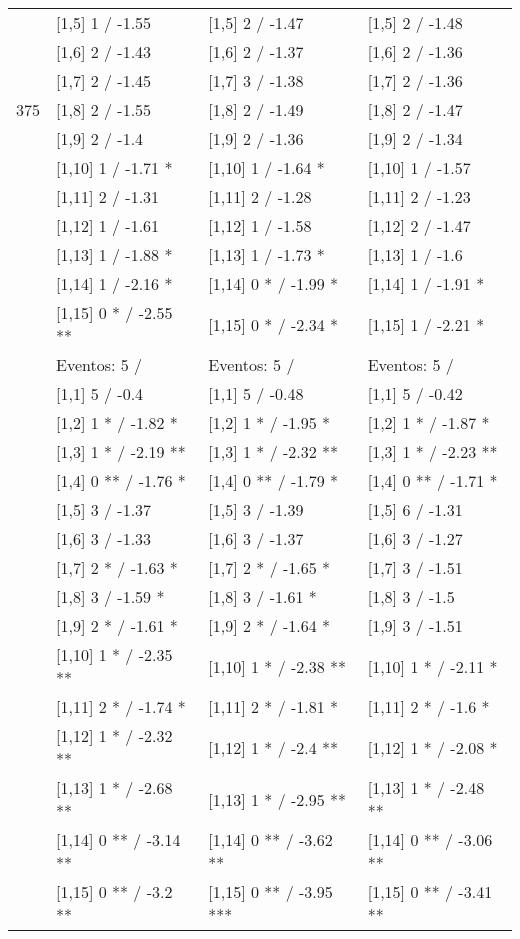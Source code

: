 \begin{table}
\begin{tabular}[t]{llll}
 & {}[1,5] 1  / -1.55 & {}[1,5] 2  / -1.47 & {}[1,5] 2  / -1.48\\
 & {}[1,6] 2  / -1.43 & {}[1,6] 2  / -1.37 & {}[1,6] 2  / -1.36\\
 & {}[1,7] 2  / -1.45 & {}[1,7] 3  / -1.38 & {}[1,7] 2  / -1.36\\
375 & {}[1,8] 2  / -1.55 & {}[1,8] 2  / -1.49 & {}[1,8] 2  / -1.47\\
\addlinespace
 & {}[1,9] 2  / -1.4 & {}[1,9] 2  / -1.36 & {}[1,9] 2  / -1.34\\
 & {}[1,10] 1  / -1.71 * & {}[1,10] 1  / -1.64 * & {}[1,10] 1  / -1.57\\
 & {}[1,11] 2  / -1.31 & {}[1,11] 2  / -1.28 & {}[1,11] 2  / -1.23\\
 & {}[1,12] 1  / -1.61 & {}[1,12] 1  / -1.58 & {}[1,12] 2  / -1.47\\
 & {}[1,13] 1  / -1.88 * & {}[1,13] 1  / -1.73 * & {}[1,13] 1  / -1.6\\
\addlinespace
 & {}[1,14] 1  / -2.16 * & {}[1,14] 0 * / -1.99 * & {}[1,14] 1  / -1.91 *\\
 & {}[1,15] 0 * / -2.55 ** & {}[1,15] 0 * / -2.34 * & {}[1,15] 1  / -2.21 *\\
 & Eventos:  5 / & Eventos:  5 / & Eventos:  5 /\\
 & {}[1,1] 5  / -0.4 & {}[1,1] 5  / -0.48 & {}[1,1] 5  / -0.42\\
 & {}[1,2] 1 * / -1.82 * & {}[1,2] 1 * / -1.95 * & {}[1,2] 1 * / -1.87 *\\
\addlinespace
 & {}[1,3] 1 * / -2.19 ** & {}[1,3] 1 * / -2.32 ** & {}[1,3] 1 * / -2.23 **\\
 & {}[1,4] 0 ** / -1.76 * & {}[1,4] 0 ** / -1.79 * & {}[1,4] 0 ** / -1.71 *\\
 & {}[1,5] 3  / -1.37 & {}[1,5] 3  / -1.39 & {}[1,5] 6  / -1.31\\
 & {}[1,6] 3  / -1.33 & {}[1,6] 3  / -1.37 & {}[1,6] 3  / -1.27\\
 & {}[1,7] 2 * / -1.63 * & {}[1,7] 2 * / -1.65 * & {}[1,7] 3  / -1.51\\
\addlinespace
500 & {}[1,8] 3  / -1.59 * & {}[1,8] 3  / -1.61 * & {}[1,8] 3  / -1.5\\
 & {}[1,9] 2 * / -1.61 * & {}[1,9] 2 * / -1.64 * & {}[1,9] 3  / -1.51\\
 & {}[1,10] 1 * / -2.35 ** & {}[1,10] 1 * / -2.38 ** & {}[1,10] 1 * / -2.11 *\\
 & {}[1,11] 2 * / -1.74 * & {}[1,11] 2 * / -1.81 * & {}[1,11] 2 * / -1.6 *\\
 & {}[1,12] 1 * / -2.32 ** & {}[1,12] 1 * / -2.4 ** & {}[1,12] 1 * / -2.08 *\\
\addlinespace
 & {}[1,13] 1 * / -2.68 ** & {}[1,13] 1 * / -2.95 ** & {}[1,13] 1 * / -2.48 **\\
 & {}[1,14] 0 ** / -3.14 ** & {}[1,14] 0 ** / -3.62 ** & {}[1,14] 0 ** / -3.06 **\\
 & {}[1,15] 0 ** / -3.2 ** & {}[1,15] 0 ** / -3.95 *** & {}[1,15] 0 ** / -3.41 **\\
\bottomrule
\end{tabular}
\end{table}
